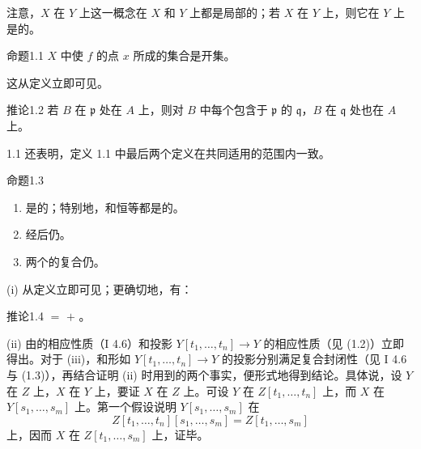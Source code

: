 注意，$X$ 在 $Y$ 上这一概念在 $X$ 和 $Y$ 上都是局部的；若 $X$ 在 $Y$ 上，则它在 $Y$ 上是的。

\begin{SGAresult}{命题}{1.1}
$X$ 中使 $f$ 的点 $x$ 所成的集合是开集。
\end{SGAresult}
这从定义立即可见。

\begin{SGAresult}{推论}{1.2}
若 $B$ 在 $\mathfrak p$ 处在 $A$ 上，则对 $B$ 中每个包含于 $\mathfrak p$ 的 $\mathfrak q$，$B$ 在 $\mathfrak q$ 处也在 $A$ 上。
\end{SGAresult}

1.1 还表明，定义 1.1 中最后两个定义在共同适用的范围内一致。

\begin{SGAresult}{命题}{1.3}
\begin{enumerate}
\item[(i)] 是的；特别地，和恒等都是的。
\item[(ii)] 经后仍。
\item[(iii)] 两个的复合仍。
\end{enumerate}
\end{SGAresult}
(i) 从定义立即可见；更确切地，有：

\begin{SGAresult}{推论}{1.4}
 $=$  $+$ 。
\end{SGAresult}

(ii) 由的相应性质（I 4.6）和投影 $Y[t_1,\ldots,t_n]\to Y$ 的相应性质（见 (1.2)）立即得出。对于 (iii)，和形如 $Y[t_1,\ldots,t_n]\to Y$ 的投影分别满足复合封闭性（见 I 4.6 与 (1.3)），再结合证明 (ii) 时用到的两个事实，便形式地得到结论。具体说，设 $Y$ 在 $Z$ 上，$X$ 在 $Y$ 上，要证 $X$ 在 $Z$ 上。可设 $Y$ 在 $Z[t_1,\ldots,t_n]$ 上，而 $X$ 在 $Y[s_1,\ldots,s_m]$ 上。第一个假设说明 $Y[s_1,\ldots,s_m]$ 在
\[
Z[t_1,\ldots,t_n][s_1,\ldots,s_m]=Z[t_1,\ldots,s_m]
\]
上，因而 $X$ 在 $Z[t_1,\ldots,s_m]$ 上，证毕。

